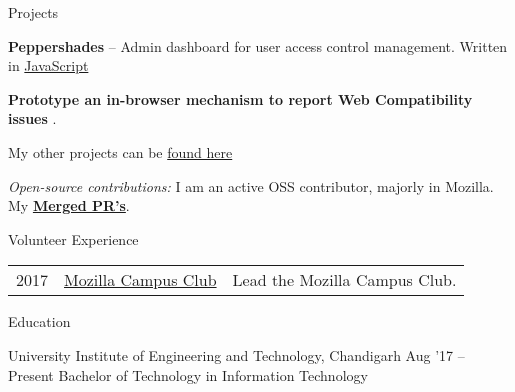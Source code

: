 \documentclass{resume} %
\begin{document}
\begin{rSection}{Projects}
  \begin{rProjectSection}
    \item \textbf {Peppershades} -- Admin dashboard for user access control management. Written in \href{https://github.com/soniasingla/peppershades}{JavaScript}
    \item \textbf {Prototype an in-browser mechanism to report Web Compatibility issues} .
    \item My other projects can be \href{https://github.com/soniasingla?tab=repositories}{found here}
  \end{rProjectSection}

  \begin{rBlurbSection}
    \item {\em Open-source contributions:}
      I am an active OSS contributor, majorly in Mozilla. My \href{https://bugzilla.mozilla.org/user_profile?user_id=632911}{\textbf{Merged PR's}}.
  \end{rBlurbSection}
\end{rSection}


\begin{rSection}{Volunteer Experience}
  \begin{tabular}{rll}
2017	     & {\href{https://github.com/moz-niec/}{Mozilla Campus Club}}  & Lead the Mozilla Campus Club.\\
\end{tabular}
\end{rSection}


\begin{rSection}{Education}
  \begin{rEducationSection}{University Institute of Engineering and Technology, Chandigarh}
                           {Aug '17 -- Present}
                           {Bachelor of Technology in Information Technology}
  \end{rEducationSection}
\end{rSection}
\end{document}
